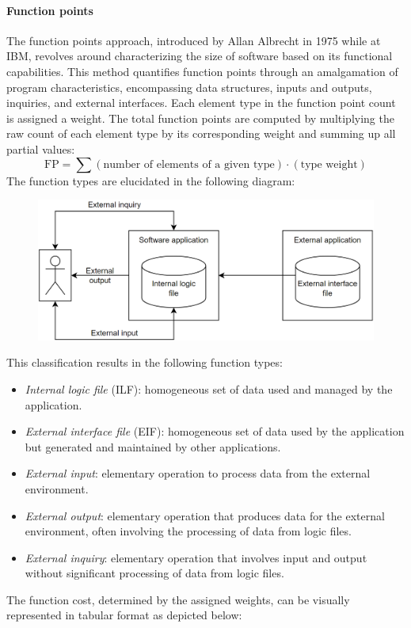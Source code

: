 \paragraph*{Function points}
The function points approach, introduced by Allan Albrecht in 1975 while at IBM, revolves around characterizing the size of software based on its functional capabilities. 
This method quantifies function points through an amalgamation of program characteristics, encompassing data structures, inputs and outputs, inquiries, and external interfaces.
Each element type in the function point count is assigned a weight. 
The total function points are computed by multiplying the raw count of each element type by its corresponding weight and summing up all partial values:
\[\text{FP}=\sum{\left(\text{number of elements of a given type}\right) \cdot \left(\text{type weight}\right)}\]
The function types are elucidated in the following diagram:
\begin{figure}[H]
    \centering
    \includegraphics[width=0.75\linewidth]{images/ft.png}
\end{figure}
This classification results in the following function types:
\begin{itemize}
    \item \textit{Internal logic file} (ILF): homogeneous set of data used and managed by the application.
    \item \textit{External interface file} (EIF): homogeneous set of data used by the application but generated and maintained by other applications.
    \item \textit{External input}: elementary operation to process data from the external environment.
    \item \textit{External output}: elementary operation that produces data for the external environment, often involving the processing of data from logic files.
    \item \textit{External inquiry}: elementary operation that involves input and output without significant processing of data from logic files.
\end{itemize}
The function cost, determined by the assigned weights, can be visually represented in tabular format as depicted below:
